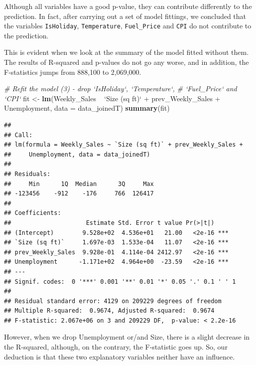 \documentclass[11pt,]{article}
\newenvironment{Shaded}{\begin{snugshade}}{\end{snugshade}}
\newcommand{\KeywordTok}[1]{\textcolor[rgb]{0.13,0.29,0.53}{\textbf{{#1}}}}
\newcommand{\DataTypeTok}[1]{\textcolor[rgb]{0.13,0.29,0.53}{{#1}}}
\newcommand{\StringTok}[1]{\textcolor[rgb]{0.31,0.60,0.02}{{#1}}}
\newcommand{\CommentTok}[1]{\textcolor[rgb]{0.56,0.35,0.01}{\textit{{#1}}}}
\newcommand{\NormalTok}[1]{{#1}}
\begin{document}
Although all variables have a good p-value, they can contribute
differently to the prediction. In fact, after carrying out a set of
model fittings, we concluded that the variables \texttt{IsHoliday},
\texttt{Temperature}, \texttt{Fuel\_Price} and \texttt{CPI} do not
contribute to the prediction.

This is evident when we look at the summary of the model fitted without
them. The results of R-squared and p-values do not go any worse, and in
addition, the F-statistics jumps from 888,100 to 2,069,000.

\begin{Shaded}
\begin{Highlighting}[]
\CommentTok{# Refit the model (3) - drop `IsHoliday`, `Temperature`,}
\CommentTok{# `Fuel_Price` and `CPI`}
\NormalTok{fit <-}\StringTok{ }\KeywordTok{lm}\NormalTok{(Weekly_Sales ~}\StringTok{ `}\DataTypeTok{Size (sq ft)}\StringTok{`} \NormalTok{+}\StringTok{ }\NormalTok{prev_Weekly_Sales +}\StringTok{ }
\StringTok{    }\NormalTok{Unemployment, }\DataTypeTok{data =} \NormalTok{data_joinedT)}
\KeywordTok{summary}\NormalTok{(fit)}
\end{Highlighting}
\end{Shaded}

\begin{verbatim}
## 
## Call:
## lm(formula = Weekly_Sales ~ `Size (sq ft)` + prev_Weekly_Sales + 
##     Unemployment, data = data_joinedT)
## 
## Residuals:
##     Min      1Q  Median      3Q     Max 
## -123456    -912    -176     766  126417 
## 
## Coefficients:
##                     Estimate Std. Error t value Pr(>|t|)    
## (Intercept)        9.528e+02  4.536e+01   21.00   <2e-16 ***
## `Size (sq ft)`     1.697e-03  1.533e-04   11.07   <2e-16 ***
## prev_Weekly_Sales  9.928e-01  4.114e-04 2412.97   <2e-16 ***
## Unemployment      -1.171e+02  4.964e+00  -23.59   <2e-16 ***
## ---
## Signif. codes:  0 '***' 0.001 '**' 0.01 '*' 0.05 '.' 0.1 ' ' 1
## 
## Residual standard error: 4129 on 209229 degrees of freedom
## Multiple R-squared:  0.9674, Adjusted R-squared:  0.9674 
## F-statistic: 2.067e+06 on 3 and 209229 DF,  p-value: < 2.2e-16
\end{verbatim}

However, when we drop Unemployment or/and Size, there is a slight
decrease in the R-squared, although, on the contrary, the F-statistic
goes up. So, our deduction is that these two explanatory variables
neither have an influence.

\begin{Shaded}
\end{Shaded}
\end{document}
